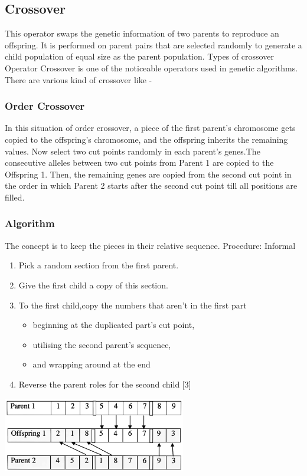 \documentclass{article}
\begin{document}
\subsection{Crossover}
This operator swaps the genetic information of two parents to reproduce an offspring. It is
performed on parent pairs that are selected randomly to generate a child population of equal size as the parent
population.
Types of crossover Operator Crossover is one of the noticeable operators used in genetic algorithms. There are
various kind of crossover like -
\subsubsection{Order Crossover}
In this situation of order crossover, a piece of the first parent's chromosome gets copied to the offspring's
chromosome, and the offspring inherits the remaining values. Now select two cut points randomly in each parent's
genes.The consecutive alleles between two cut points from Parent 1 are copied to the Offspring 1. Then, the
remaining genes are copied from the second cut point in the order in which Parent 2 starts after the second cut point
till all positions are filled.
\subsubsection*{\textbf{Algorithm}}
The concept is to keep the pieces in their relative sequence.
Procedure: Informal
\begin{enumerate}
    \item Pick a random section from the first parent.
    \item Give the first child a copy of this section.
   
    \item To the first child,copy the numbers that 
     aren't in the first part
     \begin{itemize}
     \item {beginning at the duplicated part's cut point,}
     \item utilising the second parent's sequence,
     \item and wrapping around at the end
     \end{itemize}
    \item Reverse the parent roles for the second child [3]
\end{enumerate}
\begin{center}
    \includegraphics[width=8cm]{orderCrossover.png}
\end{center}
\end{document}
